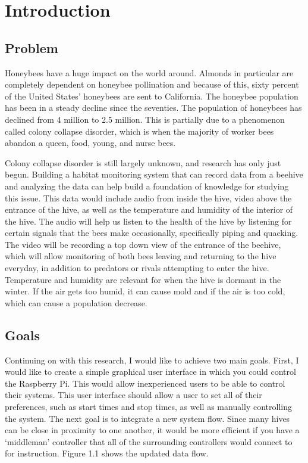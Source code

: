 
\chapter{Introduction}
\section{Problem}
Honeybees have a huge impact on the world around. Almonds in particular are completely dependent on honeybee pollination and because of this, sixty percent of the United States’ honeybees are sent to California. The honeybee population has been in a steady decline since the seventies. The population of honeybees has declined from 4 million to 2.5 million. This is partially due to a phenomenon called colony collapse disorder, which is when the majority of worker bees abandon a queen, food, young, and nurse bees. 

Colony collapse disorder is still largely unknown, and research has only just begun. Building a habitat monitoring system that can record data from a beehive and analyzing the data can help build a foundation of knowledge for studying this issue. This data would include audio from inside the hive, video above the entrance of the hive, as well as the temperature and humidity of the interior of the hive. The audio will help us listen to the health of the hive by listening for certain signals that the bees make occasionally, specifically piping and quacking. The video will be recording a top down view of the entrance of the beehive, which will allow monitoring of both bees leaving and returning to the hive everyday, in addition to predators or rivals attempting to enter the hive. Temperature and humidity are relevant for when the hive is dormant in the winter. If the air gets too humid, it can cause mold and if the air is too cold, which can cause a population decrease. 

\section{Goals}
Continuing on with this research, I would like to achieve two main goals. First, I would like to create a simple graphical user interface in which you could control the Raspberry Pi. This would allow inexperienced users to be able to control their systems. This user interface should allow a user to set all of their preferences, such as start times and stop times, as well as manually controlling the system. 
The next goal is to integrate a new system flow. Since many hives can be close in proximity to one another, it would be more efficient if you have a ‘middleman’ controller that all of the surrounding controllers would connect to for instruction. Figure 1.1 shows the updated data flow. 

